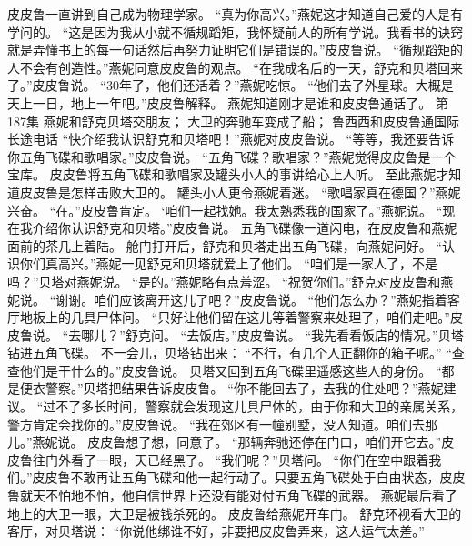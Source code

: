 \documentclass[a4paper,12pt,UTF8,twoside]{ctexbook}
\begin{document}
        皮皮鲁一直讲到自己成为物理学家。 
        “真为你高兴。”燕妮这才知道自己爱的人是有学问的。 
        “这是因为我从小就不循规蹈矩，我怀疑前人的所有学说。我看书的诀窍就是弄懂书上的每一句话然后再努力证明它们是错误的。”皮皮鲁说。 
        “循规蹈矩的人不会有创造性。”燕妮同意皮皮鲁的观点。 
        “在我成名后的一天，舒克和贝塔回来了。”皮皮鲁说。 
        “30年了，他们还活着？”燕妮吃惊。 
        “他们去了外星球。大概是天上一日，地上一年吧。”皮皮鲁解释。 
        燕妮知道刚才是谁和皮皮鲁通话了。   第187集 
        燕妮和舒克贝塔交朋友； 
        大卫的奔驰车变成了船； 
        鲁西西和皮皮鲁通国际长途电话   
        “快介绍我认识舒克和贝塔吧！”燕妮对皮皮鲁说。 
        “等等，我还要告诉你五角飞碟和歌唱家。”皮皮鲁说。 
        “五角飞碟？歌唱家？”燕妮觉得皮皮鲁是一个宝库。 
        皮皮鲁将五角飞碟和歌唱家及罐头小人的事讲给心上人听。 
        至此燕妮才知道皮皮鲁是怎样击败大卫的。 
        罐头小人更令燕妮着迷。 
        “歌唱家真在德国？”燕妮兴奋。 
        “在。”皮皮鲁肯定。 
        ‘咱们一起找她。我太熟悉我的国家了。”燕妮说。 
        “现在我介绍你认识舒克和贝塔。”皮皮鲁说。 
        五角飞碟像一道闪电，在皮皮鲁和燕妮面前的茶几上着陆。 
        舱门打开后，舒克和贝塔走出五角飞碟，向燕妮问好。 
        “认识你们真高兴。”燕妮一见舒克和贝塔就爱上了他们。 
        “咱们是一家人了，不是吗？”贝塔对燕妮说。 
        “是的。”燕妮略有点羞涩。 
        “祝贺你们。”舒克对皮皮鲁和燕妮说。 
        “谢谢。咱们应该离开这儿了吧？”皮皮鲁说。 
        “他们怎么办？”燕妮指着客厅地板上的几具尸体问。 
        “只好让他们留在这儿等着警察来处理了，咱们走吧。”皮皮鲁说。 
        “去哪儿？”舒克问。 
        “去饭店。”皮皮鲁说。 
        “我先看看饭店的情况。”贝塔钻进五角飞碟。 
        不一会儿，贝塔钻出来： 
        “不行，有几个人正翻你的箱子呢。” 
        “查查他们是干什么的。”皮皮鲁说。 
        贝塔又回到五角飞碟里遥感这些人的身份。 
        “都是便衣警察。”贝塔把结果告诉皮皮鲁。 
        “你不能回去了，去我的住处吧？”燕妮建议。 
        “过不了多长时间，警察就会发现这儿具尸体的，由于你和大卫的亲属关系，警方肯定会找你的。”皮皮鲁说。 
        “我在郊区有一幢别墅，没人知道。咱们去那儿。”燕妮说。 
        皮皮鲁想了想，同意了。 
        “那辆奔驰还停在门口，咱们开它去。”皮皮鲁往门外看了一眼，天已经黑了。 
        “我们呢？”贝塔问。 
        “你们在空中跟着我们。”皮皮鲁不敢再让五角飞碟和他一起行动了。只要五角飞碟处于自由状态，皮皮鲁就天不怕地不怕，他自信世界上还没有能对付五角飞碟的武器。 
        燕妮最后看了地上的大卫一眼，大卫是被钱杀死的。 
        皮皮鲁给燕妮开车门。 
        舒克环视看大卫的客厅，对贝塔说： 
        “你说他绑谁不好，非要把皮皮鲁弄来，这人运气太差。” 
\end{document}
